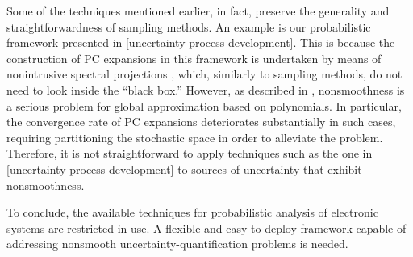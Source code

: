 Some of the techniques mentioned earlier, in fact, preserve the generality and
straightforwardness of sampling methods. An example is our probabilistic
framework presented in \cref{uncertainty-process-development}. This is because
the construction of \ac{PC} expansions in this framework is undertaken by means
of nonintrusive spectral projections \cite{xiu2010}, which, similarly to
sampling methods, do not need to look inside the ``black box.'' However, as
described in , nonsmoothness is a serious problem for
global approximation based on polynomials. In particular, the convergence rate
of \ac{PC} expansions deteriorates substantially in such cases, requiring
partitioning the stochastic space in order to alleviate the problem. Therefore,
it is not straightforward to apply techniques such as the one in
\cref{uncertainty-process-development} to sources of uncertainty that exhibit
nonsmoothness.

To conclude, the available techniques for probabilistic analysis of electronic
systems are restricted in use. A flexible and easy-to-deploy framework capable
of addressing nonsmooth uncertainty-quantification problems is needed.
